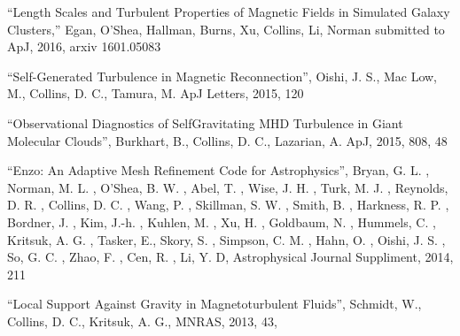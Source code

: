 \medskip
\noindent
``Length Scales and Turbulent Properties of Magnetic Fields in Simulated Galaxy Clusters,'' 
Egan, O’Shea, Hallman, Burns, Xu, Collins, Li, Norman  
submitted to ApJ, 2016, arxiv 1601.05083

\medskip
\noindent
``Self-Generated Turbulence in Magnetic Reconnection'', 
Oishi, J. S., Mac Low, M., Collins, D. C., Tamura, M.  
ApJ Letters, 2015, 120

\medskip
\noindent
``Observational Diagnostics of Self­Gravitating MHD Turbulence in Giant Molecular Clouds'', 
Burkhart, B., Collins, D.  C., Lazarian, A.
ApJ,  2015, 808, 48

\medskip
\noindent
``Enzo: An Adaptive Mesh Refinement Code for Astrophysics'', 
Bryan, G. L. , Norman, M. L. , O'Shea, B. W. , Abel, T. , Wise, J. H. , Turk, M. J. , Reynolds, D. R. , Collins, D. C. , Wang, P. , Skillman, S. W. , Smith, B. , Harkness, R. P. , Bordner, J. , Kim, J.-h. , Kuhlen, M. , Xu, H. , Goldbaum, N. , Hummels, C. , Kritsuk, A. G. , Tasker, E., Skory, S. , Simpson, C. M. , Hahn, O. , Oishi, J. S. , So, G. C. , Zhao, F. , Cen, R. , Li, Y. D,
Astrophysical Journal Suppliment, 2014, 211

\medskip
\noindent
``Local Support Against Gravity in Magnetoturbulent Fluids'',
Schmidt, W., Collins, D. C., Kritsuk, A. G.,
MNRAS, 2013, 43, 


